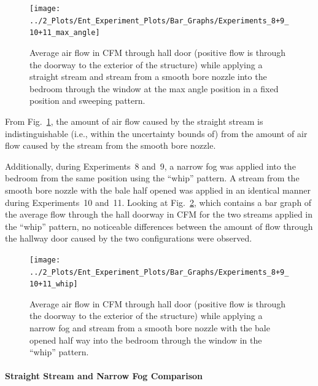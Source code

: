 \documentclass[12pt,oneside]{book}
\begin{document}
\begin{figure}[!ht]
	\centering
	\texttt{[image: ../2\_Plots/Ent\_Experiment\_Plots/Bar\_Graphs/Experiments\_8+9\_10+11\_max\_angle]}
	\caption{Average air flow in CFM through hall door (positive flow is through the doorway to the exterior of the structure) while applying a straight stream and stream from a smooth bore nozzle into the bedroom through the window at the max angle position in a fixed position and sweeping pattern.}
	\label{fig:Exps8_9_10_and_11_bar_graph}
\end{figure}

From Fig.~\ref{fig:Exps8_9_10_and_11_bar_graph}, the amount of air flow caused by the straight stream is indistinguishable (i.e., within the uncertainty bounds of) from the amount of air flow caused by the stream from the smooth bore nozzle.

Additionally, during Experiments~8 and~9, a narrow fog was applied into the bedroom from the same position using the ``whip'' pattern. A stream from the smooth bore nozzle with the bale half opened was applied in an identical manner during Experiments~10 and~11. Looking at Fig.~\ref{fig:Exps8_9_10_and_11_whip_bar_graph}, which contains a bar graph of the average flow through the hall doorway in CFM for the two streams applied in the ``whip'' pattern, no noticeable differences between the amount of flow through the hallway door caused by the two configurations were observed.

\begin{figure}[!ht]
	\centering
	\texttt{[image: ../2\_Plots/Ent\_Experiment\_Plots/Bar\_Graphs/Experiments\_8+9\_10+11\_whip]}
	\caption{Average air flow in CFM through hall door (positive flow is through the doorway to the exterior of the structure) while applying a narrow fog and stream from a smooth bore nozzle with the bale opened half way into the bedroom through the window in the ``whip'' pattern.}
	\label{fig:Exps8_9_10_and_11_whip_bar_graph}
\end{figure}

\FloatBarrier

\paragraph{Straight Stream and Narrow Fog Comparison} \mbox{}
\end{document}
